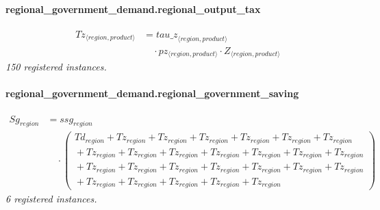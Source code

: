 \documentclass[11pt]{article}
\begin{document}
\paragraph{regional\_government\_demand.regional\_output\_tax}
\begin{align*}
Tz_{\langle region, product\rangle} &= {tau\_z}_{\langle region, product\rangle}\\
&\quad {}\cdot pz_{\langle region, product\rangle} \cdot Z_{\langle region, product\rangle}
\end{align*}
\noindent\emph{150 registered instances.}\par
\paragraph{regional\_government\_demand.regional\_government\_saving}
\begin{align*}
Sg_{region} &= ssg_{region}\\
&\quad {}\cdot (\begin{aligned}
Td_{region} + Tz_{region} + Tz_{region} + Tz_{region} + Tz_{region} + Tz_{region} + Tz_{region}\\
{}+ Tz_{region} + Tz_{region} + Tz_{region} + Tz_{region} + Tz_{region} + Tz_{region} + Tz_{region}\\
{}+ Tz_{region} + Tz_{region} + Tz_{region} + Tz_{region} + Tz_{region} + Tz_{region} + Tz_{region}\\
{}+ Tz_{region} + Tz_{region} + Tz_{region} + Tz_{region} + Tz_{region}
\end{aligned})
\end{align*}
\noindent\emph{6 registered instances.}\par
\end{document}
